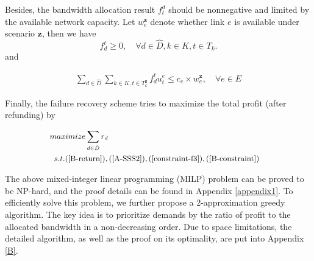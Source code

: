 \documentclass[sigconf]{acmart}
\begin{document}
Besides, the bandwidth allocation result $f_t^d$ should be nonnegative
and limited by the available network capacity. 
Let $w_e^{ \mathbf{z}}$ denote whether link $e$ is available under scenario $ \mathbf{z}$, 
then we have 
\begin{equation}
f^{t}_{d} \ge 0, \quad\forall d \in \hat{D} ,  k\in K,  t\in T_k.
\label{constraint-f3}
\end{equation}
and 
\begin{small}
\begin{eqnarray} \label{B-constraint}
\sum_{d\in \hat{D}}\sum_{k\in K, t\in T^{ \mathbf{z}}_k} f^{t}_{d}u_t^e \le c_e \times w_e^{ \mathbf{z}}, \quad \forall e \in E
\end{eqnarray}
\end{small}

Finally, the failure recovery scheme tries to maximize the total profit (after refunding) by 

\begin{equation}
\small
\begin{aligned} \label{BATE-recovery}
 &maximize  \sum_{d\in \hat{D}} r_d\\
&\begin{array}{r@{\quad}r@{}l@{\quad}l}
s.t.  (\ref{B-return}), (\ref{A-SSS2}), (\ref{constraint-f3}), (\ref{B-constraint})
\end{array}
\end{aligned}
\end{equation}

The above mixed-integer linear programming  (MILP) problem can be proved to be NP-hard, 
and the proof details can be found in Appendix \ref{appendix1}.
To efficiently solve this problem, we further propose a 2-approximation greedy algorithm.
The key idea is to prioritize demands by the ratio of profit to the allocated bandwidth in a non-decreasing order.
Due to space limitations, the detailed algorithm, as well as the proof on its optimality, 
are put into Appendix \ref{B}.

\end{document}
